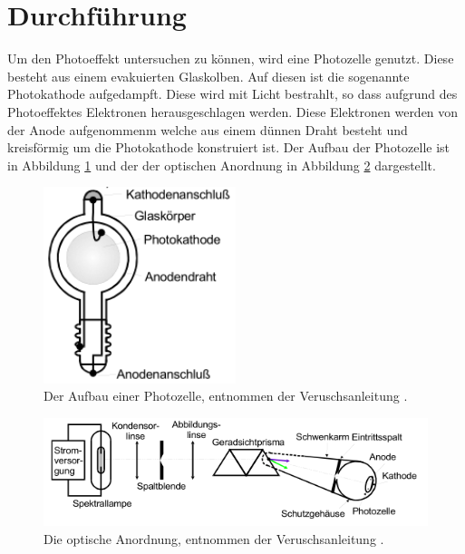 \section{Durchführung}
\label{sec:Durchführung}

Um den Photoeffekt untersuchen zu können, wird eine Photozelle genutzt.
Diese besteht aus einem evakuierten Glaskolben.
Auf diesen ist die sogenannte Photokathode aufgedampft.
Diese wird mit Licht bestrahlt, so dass aufgrund des Photoeffektes Elektronen herausgeschlagen werden.
Diese Elektronen werden von der Anode aufgenommenm welche aus einem dünnen Draht besteht und kreisförmig um die Photokathode konstruiert ist.
Der Aufbau der Photozelle ist in Abbildung \ref{fig:Photozelle} und der der optischen Anordnung in Abbildung \ref{fig:Aufbau} dargestellt.

  \begin{figure}
    \centering
    \includegraphics[width=0.5\textwidth]{images/Photozelle.png}
    \caption{Der Aufbau einer Photozelle, entnommen der Veruschsanleitung \cite[75]{sample}.}
    \label{fig:Photozelle}
  \end{figure}
  \begin{figure}
    \centering
    \includegraphics[width=1\linewidth]{images/Aufbau.png}
    \caption{Die optische Anordnung, entnommen der Veruschsanleitung \cite[75]{sample}.}
    \label{fig:Aufbau}
  \end{figure}
